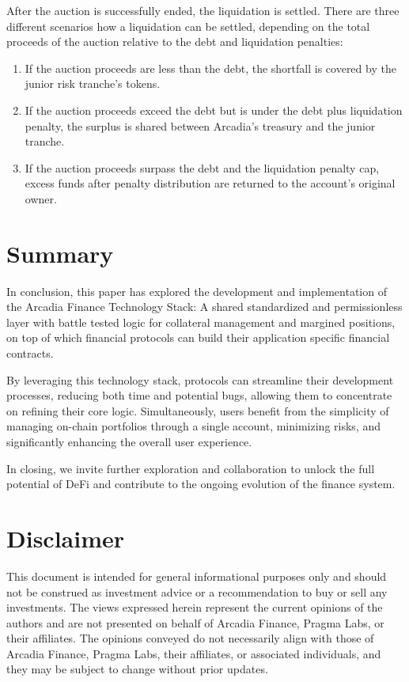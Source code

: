 \documentclass[sigconf,nonacm]{acmart}
\begin{document}
After the auction is successfully ended, the liquidation is settled.
There are three different scenarios how a liquidation can be settled,
depending on the total proceeds of the auction relative to the debt and liquidation penalties:
\begin{enumerate}
    \item If the auction proceeds are less than the debt,
    the shortfall is covered by the junior risk tranche's tokens.
    \item If the auction proceeds exceed the debt but is under the debt plus liquidation penalty,
    the surplus is shared between Arcadia's treasury and the junior tranche.
    \item If the auction proceeds surpass the debt and the liquidation penalty cap,
    excess funds after penalty distribution are returned to the account's original owner.
\end{enumerate}

\section{Summary}
\label{sec:summary}
In conclusion, this paper has explored the development and implementation of the Arcadia Finance Technology Stack:
A shared standardized and permissionless layer with battle tested logic for collateral management and margined positions,
on top of which financial protocols can build their application specific financial contracts.

By leveraging this technology stack, protocols can streamline their development processes, reducing both time and potential bugs,
allowing them to concentrate on refining their core logic. 
Simultaneously, users benefit from the simplicity of managing on-chain portfolios through a single account, minimizing risks, and significantly enhancing the overall user experience.

In closing, we invite further exploration and collaboration to unlock the full potential of DeFi and contribute to the ongoing evolution of the finance system.

\section*{Disclaimer}
This document is intended for general informational purposes only and should not be construed as investment advice or
a recommendation to buy or sell any investments.
The views expressed herein represent the current opinions of the authors and are not presented on behalf of Arcadia Finance, Pragma Labs, or their affiliates.
The opinions conveyed do not necessarily align with those of Arcadia Finance, Pragma Labs, their affiliates, or associated individuals,
and they may be subject to change without prior updates.



\end{document}
